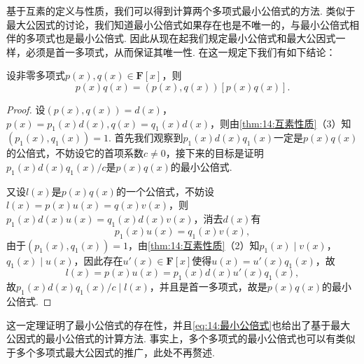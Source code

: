基于互素的定义与性质，我们可以得到计算两个多项式最小公倍式的方法. 类似于最大公因式的讨论，我们知道最小公倍式如果存在也是不唯一的，与最小公倍式相伴的多项式也是最小公倍式. 因此从现在起我们规定最小公倍式和最大公因式一样，必须是首一多项式，从而保证其唯一性. 在这一规定下我们有如下结论：
\begin{theorem}
    设非零多项式$p(x),q(x)\in\mathbf{F}[x]$，则
    \begin{equation} \label{eq:14:最小公倍式}
        p(x)q(x)=(p(x),q(x))[p(x)q(x)].
    \end{equation}
\end{theorem}
\begin{proof}
    设$(p(x),q(x))=d(x)$，$p(x)=p_1(x)d(x),q(x)=q_1(x)d(x)$，则由\autoref{thm:14:互素性质}（3）知$(p_1(x),q_1(x))=1$. 首先我们观察到$p_1(x)d(x)q_1(x)$一定是$p(x)q(x)$的公倍式，不妨设它的首项系数$c\neq 0$，接下来的目标是证明$p_1(x)d(x)q_1(x)/c$是$p(x)q(x)$的最小公倍式.

    又设$l(x)$是$p(x)q(x)$的一个公倍式，不妨设$l(x)=p(x)u(x)=q(x)v(x)$，则$p_1(x)d(x)u(x)=q_1(x)d(x)v(x)$，消去$d(x)$有
    \[p_1(x)u(x)=q_1(x)v(x),\]
    由于$(p_1(x),q_1(x))=1$，由\autoref{thm:14:互素性质}（2）知$p_1(x)\mid v(x)$，$q_1(x)\mid u(x)$，因此存在$u'(x)\in\mathbf{F}[x]$使得$u(x)=u'(x)q_1(x)$，故
    \[l(x)=p(x)u(x)=p_1(x)d(x)u'(x)q_1(x),\]
    故$p_1(x)d(x)q_1(x)/c\mid l(x)$，并且是首一多项式，故是$p(x)q(x)$的最小公倍式.
\end{proof}

这一定理证明了最小公倍式的存在性，并且\autoref{eq:14:最小公倍式}也给出了基于最大公因式的最小公倍式的计算方法. 事实上，多个多项式的最小公倍式也可以有类似于多个多项式最大公因式的推广，此处不再赘述.

